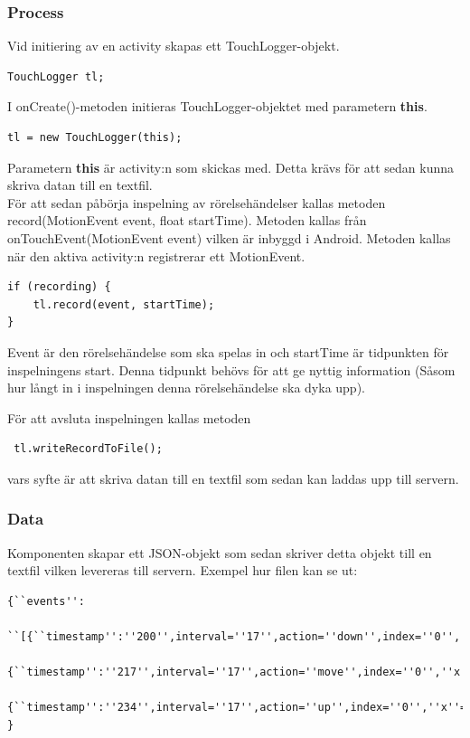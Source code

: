 \subsubsection{Process}
Vid initiering av en activity skapas ett TouchLogger-objekt. 
\begin{verbatim}
TouchLogger tl;
\end{verbatim}
I onCreate()-metoden initieras TouchLogger-objektet med parametern \textbf{this}.
\begin{verbatim}
tl = new TouchLogger(this);
\end{verbatim}
Parametern \textbf{this} är activity:n som skickas med. Detta krävs för att sedan kunna skriva datan till en textfil. \\
För att sedan påbörja inspelning av rörelsehändelser kallas metoden record(MotionEvent event, float startTime). Metoden kallas från onTouchEvent(MotionEvent event) vilken är inbyggd i Android. Metoden kallas när den aktiva activity:n registrerar ett MotionEvent. 
\begin{verbatim}
if (recording) {
    tl.record(event, startTime);
}
\end{verbatim}
Event är den rörelsehändelse som ska spelas in och startTime är tidpunkten för inspelningens start. Denna tidpunkt behövs för att ge nyttig information (Såsom hur långt in i inspelningen denna rörelsehändelse ska dyka upp).

 För att avsluta inspelningen kallas metoden
 \begin{verbatim}
 tl.writeRecordToFile();
 \end{verbatim}
 vars syfte är att skriva datan till en textfil som sedan kan laddas upp till servern.
\subsubsection{Data}
Komponenten skapar ett JSON-objekt som sedan skriver detta objekt till en textfil vilken levereras till servern. Exempel hur filen kan se ut:
\begin{verbatim}
{``events'':
	``[{``timestamp'':''200'',interval=''17'',action=''down'',index=''0'',''x''=''310'',y=''670''},
	     {``timestamp'':''217'',interval=''17'',action=''move'',index=''0'',''x''=''320'',y=''680''},
	     {``timestamp'':''234'',interval=''17'',action=''up'',index=''0'',''x''=''330'',y=''700''}]''
}
\end{verbatim}